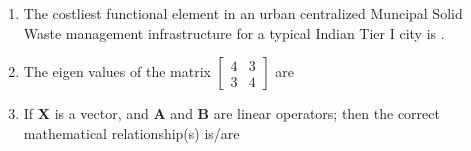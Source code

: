\documentclass[journal]{IEEEtran}
\numberwithin{equation}{enumi}
\numberwithin{figure}{enumi}
\begin{document}
\begin{enumerate}[start=1, label={Q\arabic*.}]
  \begin{enumerate} 
  \end{enumerate}
\item The costliest functional element in an urban centralized Muncipal Solid Waste management infrastructure for a typical Indian Tier $\mathrm{I}$ city is \underline{\hspace{1.5cm}}.
 \begin{enumerate} 
  \end{enumerate}
\newpage
\item The eigen values of the matrix $\begin{bmatrix} 4 & 3 \\ 3 & 4 \end{bmatrix}$ are
 \begin{enumerate} 
  \end{enumerate}
\item If $\mathbf{X}$ is a vector, and $\mathbf{A}$ and $\mathbf{B}$ are linear operators; then the correct mathematical relationship(s) is/are
 \begin{enumerate} 

\end{enumerate}
\end{enumerate}
\end{document}
